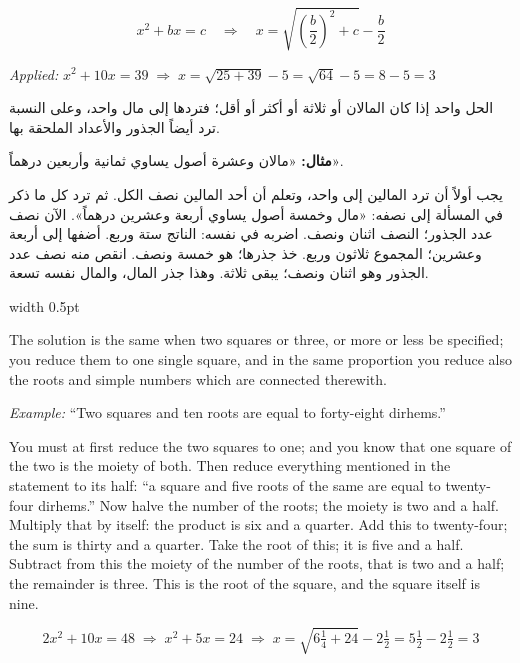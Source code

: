\documentclass[10pt,a4paper]{book}
\newlength{\colwidth}
\newcommand{\bilingualpair}[2]{%
  \noindent
  \begin{minipage}[t]{\colwidth}
  \begin{flushright}
  \vspace{0pt}
  {\arabicfont\small #1}
  \end{flushright}
  \end{minipage}%
  \hfill\textcolor{columnsepclr}{\vrule width 0.5pt}\hfill
  \begin{minipage}[t]{\colwidth}
  \vspace{0pt}
  {\small #2}
  \end{minipage}%
  \par\vspace{0.6em}
}
\begin{document}
\vspace{0.5em}
\begin{mathbox}[title={\textbf{The Algorithm for Case IV}}]
\begin{equation}
x^2 + bx = c \quad\Longrightarrow\quad x = \sqrt{\left(\frac{b}{2}\right)^2 + c} - \frac{b}{2}
\end{equation}

\textit{Applied:} $x^2 + 10x = 39 \;\Rightarrow\; x = \sqrt{25 + 39} - 5 = \sqrt{64} - 5 = 8 - 5 = 3$
\end{mathbox}
\vspace{0.5em}

\bilingualpair{
الحل واحد إذا كان المالان أو ثلاثة أو أكثر أو أقل؛ فتردها إلى
مال واحد، وعلى النسبة ترد أيضاً الجذور والأعداد الملحقة بها.

\textbf{مثال:} «مالان وعشرة أصول يساوي ثمانية وأربعين درهماً».

يجب أولاً أن ترد المالين إلى واحد، وتعلم أن أحد المالين نصف
الكل. ثم ترد كل ما ذكر في المسألة إلى نصفه: «مال وخمسة
أصول يساوي أربعة وعشرين درهماً». الآن نصف عدد الجذور؛
النصف اثنان ونصف. اضربه في نفسه: الناتج ستة وربع.
أضفها إلى أربعة وعشرين؛ المجموع ثلاثون وربع. خذ جذرها؛
هو خمسة ونصف. انقص منه نصف عدد الجذور وهو اثنان ونصف؛
يبقى ثلاثة. وهذا جذر المال، والمال نفسه تسعة.
}{
The solution is the same when two squares or three, or more or less be
specified; you reduce them to one single square, and in the same proportion
you reduce also the roots and simple numbers which are connected therewith.

\textit{Example:} ``Two squares and ten roots are equal to forty-eight
dirhems.''

You must at first reduce the two squares to one; and you know that one square
of the two is the moiety of both. Then reduce everything mentioned in the
statement to its half: ``a square and five roots of the same are equal to
twenty-four dirhems.'' Now halve the number of the roots; the moiety is two
and a half. Multiply that by itself: the product is six and a quarter. Add
this to twenty-four; the sum is thirty and a quarter. Take the root of this;
it is five and a half. Subtract from this the moiety of the number of the
roots, that is two and a half; the remainder is three. This is the root of
the square, and the square itself is nine.
}

\begin{equation}
2x^2 + 10x = 48 \;\Rightarrow\; x^2 + 5x = 24 \;\Rightarrow\;
x = \sqrt{6\tfrac{1}{4} + 24} - 2\tfrac{1}{2} = 5\tfrac{1}{2} - 2\tfrac{1}{2} = 3
\end{equation}
\end{document}
